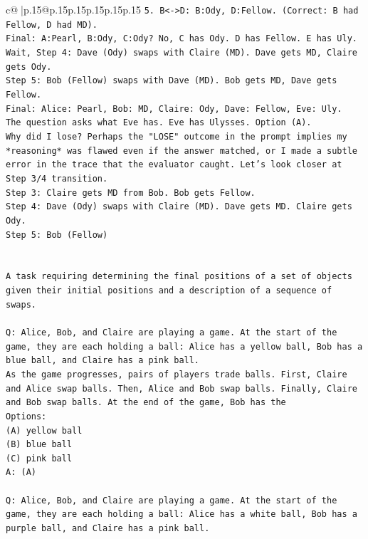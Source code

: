 \documentclass{article}
\begin{document}
{\begin{supertabular}{c@{$\;$}|p{.15\linewidth}@{}p{.15\linewidth}p{.15\linewidth}p{.15\linewidth}p{.15\linewidth}p{.15\linewidth}}
{{{\texttt{5. B<{-}>D: B:Ody, D:Fellow. (Correct: B had Fellow, D had MD).} \\
\texttt{Final: A:Pearl, B:Ody, C:Ody? No, C has Ody. D has Fellow. E has Uly.} \\
\texttt{Wait, Step 4: Dave (Ody) swaps with Claire (MD). Dave gets MD, Claire gets Ody.} \\
\texttt{Step 5: Bob (Fellow) swaps with Dave (MD). Bob gets MD, Dave gets Fellow.} \\
\texttt{Final: Alice: Pearl, Bob: MD, Claire: Ody, Dave: Fellow, Eve: Uly.} \\
\texttt{The question asks what Eve has. Eve has Ulysses. Option (A).} \\
\texttt{Why did I lose? Perhaps the "LOSE" outcome in the prompt implies my *reasoning* was flawed even if the answer matched, or I made a subtle error in the trace that the evaluator caught. Let's look closer at Step 3/4 transition.} \\
\texttt{Step 3: Claire gets MD from Bob. Bob gets Fellow.} \\
\texttt{Step 4: Dave (Ody) swaps with Claire (MD). Dave gets MD. Claire gets Ody.} \\
\texttt{Step 5: Bob (Fellow)} \\
\\ 
\\ 
\texttt{A task requiring determining the final positions of a set of objects given their initial positions and a description of a sequence of swaps.} \\
\\ 
\texttt{Q: Alice, Bob, and Claire are playing a game. At the start of the game, they are each holding a ball: Alice has a yellow ball, Bob has a blue ball, and Claire has a pink ball.} \\
\texttt{As the game progresses, pairs of players trade balls. First, Claire and Alice swap balls. Then, Alice and Bob swap balls. Finally, Claire and Bob swap balls. At the end of the game, Bob has the} \\
\texttt{Options:} \\
\texttt{(A) yellow ball} \\
\texttt{(B) blue ball} \\
\texttt{(C) pink ball} \\
\texttt{A: (A)} \\
\\ 
\texttt{Q: Alice, Bob, and Claire are playing a game. At the start of the game, they are each holding a ball: Alice has a white ball, Bob has a purple ball, and Claire has a pink ball.} \\
}}}
\end{supertabular}}
\end{document}
